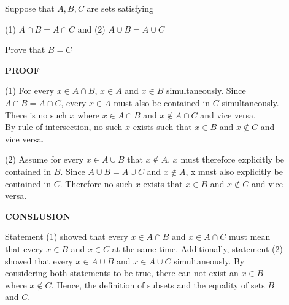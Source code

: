 \documentclass{article}
\begin{document}

\begin{flushleft}
Suppose that $A, B, C$ are sets satisfying \\
\begin{center}
(1) $A \cap B = A \cap C$  and (2) $A \cup B = A \cup C$
\end{center}
Prove that $B=C$
\end{flushleft}

\begin{flushleft}
\textbf{PROOF}
\end{flushleft}

\begin{flushleft}
 (1)\:\: For every $x \in A \cap B$, $x \in A$ and $x \in B$ simultaneously. Since \\
\qquad  $A \cap B = A \cap C$, every $x \in A$ must also be contained in $C$ simultaneously.\\
\qquad  There is no such $x$ where $x \in A \cap B$ and $x \not \in A \cap C$ and vice versa.\\ 
\qquad  By rule of intersection, no such $x$ exists such that $x \in B$ and $x \not \in C$ and \\
\qquad vice versa. \\ 
\end{flushleft}

\begin{flushleft}
 (2)\:\: Assume for every $x \in A \cup B$ that $x \not \in A$. $x$ must therefore explicitly be \\ \qquad contained in $B$. Since $A \cup B = A \cup C$ and $x \not \in A$, x must also explicitly be \\\qquad contained in $C$. Therefore no such $x$ exists that $x \in B$ and $x \not \in C$ and vice \\ \qquad versa. \\
\end{flushleft}

\begin{flushleft}
\textbf{CONSLUSION}\\
\end{flushleft}

\begin{flushleft}
\qquad Statement (1) showed that every $x \in A \cap B$ and $x \in A \cap C$ must mean \\ 
\qquad that every $x \in B$ and $x \in C$ at the same time. Additionally, statement (2) \\
\qquad showed that every $x \in A \cup B$ and $x \in A \cup C$ simultaneously. By \\
\qquad considering both statements to be true, there can not exist an $x \in B$ \\
\qquad where $x \not \in C$. Hence, the definition of subsets and the equality of sets $B$ \\
\qquad and $C$.
\end{flushleft}
\end{document}
